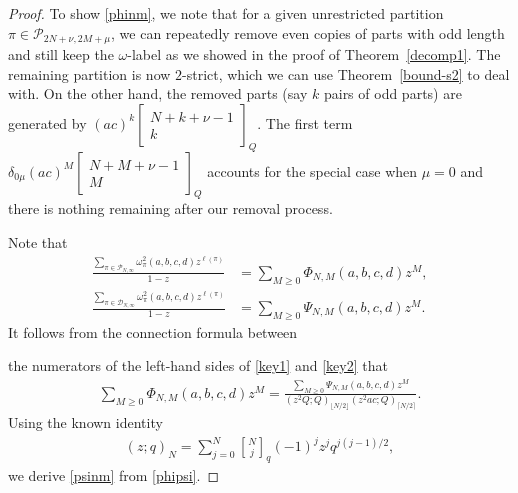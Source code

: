 \documentclass[12pt]{amsart}
\numberwithin{equation}{section}
\theoremstyle{plain}
\theoremstyle{definition}
\newcommand\qbin[3]{\left[\begin{matrix} #1 \\ #2 \end{matrix} \right]_{#3}}
\begin{document}
\begin{proof}
To show \eqref{phinm}, we note that for a given unrestricted partition $\pi\in\mathcal{P}_{2N+\nu,2M+\mu}$, we can repeatedly remove even copies of parts with odd length and still keep the $\omega$-label as we showed in the proof of Theorem~\ref{decomp1}. The remaining partition is now $2$-strict, which we can use 
Theorem~\ref{bound-s2} to deal with. On the other hand, the removed parts (say $k$ pairs of odd parts) are generated by $(ac)^k\qbin{N+k+\nu-1}{k}{Q}$. The first term $\delta_{0\mu}(ac)^M\qbin{N+M+\nu-1}{M}{Q}$ accounts for the special case when $\mu=0$ and there is nothing remaining after our removal process.








Note that
\begin{align}
\frac{\sum_{\pi\in\mathcal{P}_{N,\infty}}\omega^2_{\pi}(a,b,c,d)z^{\ell(\pi)}}{1-z}&=\sum_{M\geq 0} \Phi_{N,M}(a,b,c,d)z^M,\label{key1}\\
\frac{\sum_{\pi\in\mathcal{D}_{N,\infty}}\omega^2_{\pi}(a,b,c,d)z^{\ell(\pi)}}{1-z}&=\sum_{M\geq 0} \Psi_{N,M}(a,b,c,d)z^M.\label{key2}
\end{align}
It follows from the connection formula \cite[Theorem 4.1]{iz} between 

the numerators of 
the left-hand sides of \eqref{key1} and \eqref{key2}
that  
\begin{align}\label{phipsi}
\sum_{M\geq 0} \Phi_{N,M}(a,b,c,d)z^M=
\frac{\sum_{M\geq 0} \Psi_{N,M}(a,b,c,d)z^M}{(z^2 Q;Q)_{\lfloor N/2\rfloor}(z^2 ac;Q)_{\lceil N/2\rceil}}.
\end{align}
Using the known identity~\cite[(3.3.6)]{andtp} 
\begin{align}\label{euler1}
(z;q)_N=\sum_{j=0}^N{N\brack j}_q (-1)^jz^j q^{j(j-1)/2},
\end{align}
we derive \eqref{psinm} from \eqref{phipsi}.
\end{proof}
\end{document}
